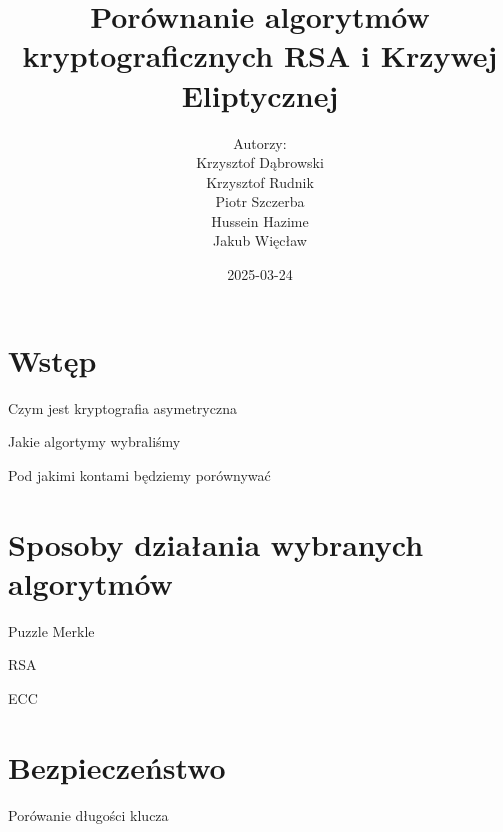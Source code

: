 \documentclass{beamer}
\title{Porównanie algorytmów kryptograficznych RSA i Krzywej Eliptycznej}
\author{Autorzy:\\ Krzysztof Dąbrowski\\ Krzysztof Rudnik\\ Piotr Szczerba\\ Hussein Hazime\\ Jakub Więcław}
\date{2025-03-24}
\begin{document}
\begin{frame}
    \titlepage
\end{frame}

\section{Wstęp}
\begin{frame}{Czym jest kryptografia asymetryczna}
\end{frame}

\begin{frame}{Jakie algortymy wybraliśmy}
    
\end{frame}
\begin{frame}{Pod jakimi kontami będziemy porównywać}
    
\end{frame}

\section{Sposoby działania wybranych algorytmów}
\begin{frame}{Puzzle Merkle} %
    
\end{frame}


\begin{frame}{RSA}
    
\end{frame}



\begin{frame}{ECC}
    
\end{frame}




\section{Bezpieczeństwo}

\begin{frame}{Porówanie długości klucza}
\end{frame}
\end{document}
